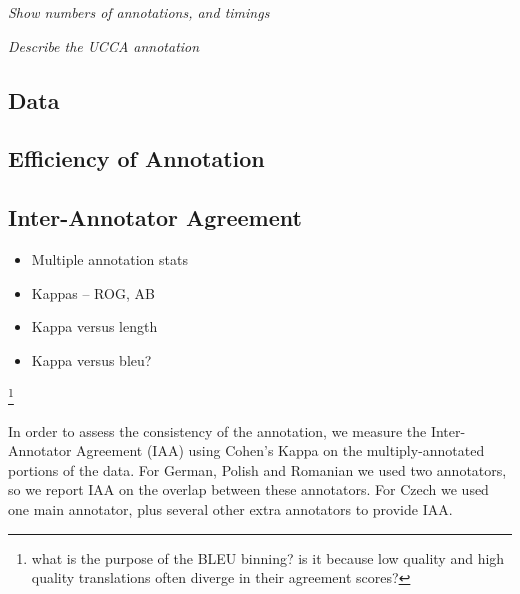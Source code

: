 \documentclass[11pt]{article}
\newcommand{\oa}[1]{\footnote{\color{red} #1}}
\begin{document}
\emph{Show numbers of annotations, and timings}

\emph{Describe the UCCA annotation}

\subsection{Data}\label{sec:data}

\subsection{Efficiency of Annotation}\label{sec:efficiency}



\subsection{Inter-Annotator Agreement}
\begin{itemize}
  \item Multiple annotation stats
  \item Kappas -- ROG, AB
  \item Kappa versus length
  \item Kappa versus bleu?
\end{itemize}

\oa{what is the purpose of the BLEU binning? is it because low quality and high
quality translations often diverge in their agreement scores?}



In order to assess the consistency of the annotation, we measure the Inter-Annotator
Agreement (IAA) using Cohen's Kappa on the multiply-annotated portions of the data.
For German, Polish and Romanian we used two annotators, so we report IAA on the overlap
between these annotators. For Czech we used one main annotator, plus several other extra
annotators to provide IAA. 
\end{document}
